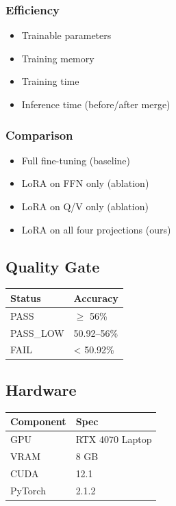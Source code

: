 \subsubsection{Efficiency}
\begin{itemize}
\item Trainable parameters
\item Training memory
\item Training time
\item Inference time (before/after merge)

\end{itemize}
\subsubsection{Comparison}
\begin{itemize}
\item Full fine-tuning (baseline)
\item LoRA on FFN only (ablation)
\item LoRA on Q/V only (ablation)
\item LoRA on all four projections (ours)

\end{itemize}
\subsection{Quality Gate}

\begin{table}[H]
\centering
\small
\begin{tabular}{ll}
\toprule
\textbf{Status} & \textbf{Accuracy} \\
\midrule
PASS & $\ge$ 56\% \\
PASS\_LOW & 50.92--56\% \\
FAIL & \textless{} 50.92\% \\
\bottomrule
\end{tabular}
\end{table}

\subsection{Hardware}

\begin{table}[H]
\centering
\small
\begin{tabular}{ll}
\toprule
\textbf{Component} & \textbf{Spec} \\
\midrule
GPU & RTX 4070 Laptop \\
VRAM & 8 GB \\
CUDA & 12.1 \\
PyTorch & 2.1.2 \\
\bottomrule
\end{tabular}
\end{table}

